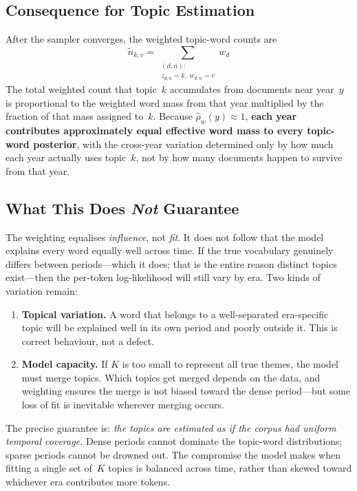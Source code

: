 \documentclass[11pt]{article}
\begin{document}
\subsection{Consequence for Topic Estimation}

After the sampler converges, the weighted topic-word counts are
\[
\tilde n_{k,v}
  = \sum_{\substack{(d,n):\\z_{d,n}=k,\;w_{d,n}=v}} w_d
\]
The total weighted count that topic~$k$ accumulates from documents near year~$y$ is proportional to the weighted word mass from that year multiplied by the fraction of that mass assigned to~$k$.
Because $\hat\rho_w(y) \approx 1$, \textbf{each year contributes approximately equal effective word mass to every topic-word posterior},
with the cross-year variation determined only by how much each year actually uses topic~$k$, not by how many documents happen to survive from that year.

\subsection{What This Does \emph{Not} Guarantee}

The weighting equalises \emph{influence}, not \emph{fit}.
It does not follow that the model explains every word equally well across time.
If the true vocabulary genuinely differs between periods---which it does; that is the entire reason distinct topics exist---then the per-token log-likelihood will still vary by era.
Two kinds of variation remain:

\begin{enumerate}
\item \textbf{Topical variation.}
  A word that belongs to a well-separated era-specific topic will be explained well in its own period and poorly outside it.
  This is correct behaviour, not a defect.

\item \textbf{Model capacity.}
  If $K$ is too small to represent all true themes, the model must merge topics.
  Which topics get merged depends on the data, and weighting ensures the merge is not biased toward the dense period---but some loss of fit is inevitable wherever merging occurs.
\end{enumerate}

The precise guarantee is: \emph{the topics are estimated as if the corpus had uniform temporal coverage.}
Dense periods cannot dominate the topic-word distributions; sparse periods cannot be drowned out.
The compromise the model makes when fitting a single set of~$K$ topics is balanced across time, rather than skewed toward whichever era contributes more tokens.
\end{document}
